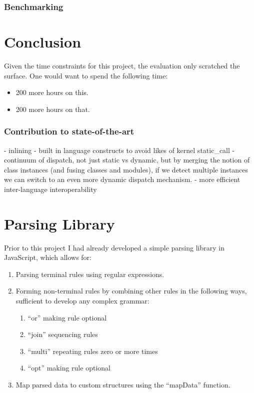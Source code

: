 \documentclass[12pt,a4paper,twoside]{report}
\begin{document}
\subsection{Benchmarking}



\chapter{Conclusion}

Given the time constraints for this project, the evaluation only scratched the surface. One would want to spend the following time:

\begin{itemize}
  \item 200 more hours on this.
  \item 200 more hours on that.
\end{itemize}

\subsection{Contribution to state-of-the-art}

- inlining
- built in language constructs to avoid likes of kernel static\_call
- continuum of dispatch, not just static vs dynamic, but by merging the notion of class instances (and fusing classes and modules), if we detect multiple instances we can switch to an even more dynamic dispatch mechanism.
- more efficient inter-language interoperability

\chapter{Parsing Library}

Prior to this project I had already developed a simple parsing library in JavaScript, which allows for:

\begin{enumerate}
	\item Parsing terminal rules using regular expressions.
	\item Forming non-terminal rules by combining other rules in the following ways, sufficient to develop any complex grammar: \begin{enumerate}
	\item ``or'' making rule optional
	\item ``join'' sequencing rules
	\item ``multi'' repeating rules zero or more times
	\item ``opt'' making rule optional
	\end{enumerate}
	\item Map parsed data to custom structures using the ``mapData'' function.
\end{enumerate}
\end{document}
